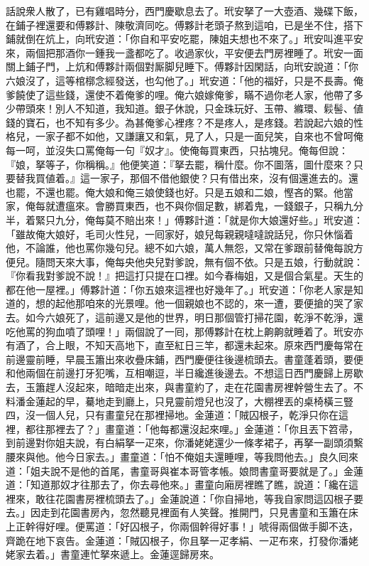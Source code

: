 話說衆人散了，已有雞唱時分，西門慶歇息去了。玳安拏了一大壺酒、幾碟下飯，在鋪子裡還要和傅夥計、陳敬濟同吃。傅夥計老頭子熬到這咱，已是坐不住，搭下鋪就倒在炕上，向玳安道：「你自和平安吃罷，陳姐夫想也不來了。」玳安叫進平安來，兩個把那酒你一鍾我一盞都吃了。收過家伙，平安便去門房裡睡了。玳安一面關上鋪子門，上炕和傅夥計兩個對厮脚兒睡下。傅夥計因閑話，向玳安說道：「你六娘沒了，這等棺槨念經發送，也勾他了。」玳安道：「他的福好，只是不長壽。俺爹饒使了這些錢，還使不着俺爹的哩。俺六娘嫁俺爹，瞞不過你老人家，他帶了多少帶頭來！別人不知道，我知道。銀子休說，只金珠玩好、玉帶、縧環、鬏髻、値錢的寶石，也不知有多少。為甚俺爹心裡疼？不是疼人，是疼錢。{}若說起六娘的性格兒，一家子都不如他，又謙讓又和氣，見了人，只是一面兒笑，自來也不曾呵俺每一呵，並沒失口罵俺每一句『奴才』。使俺每買東西，只拈塊兒。俺每但說：『娘，拏等子，你稱稱。』他便笑道：『拏去罷，稱什麼。你不圖落，圖什麼來？只要替我買値着。』這一家子，那個不借他銀使？只有借出來，沒有個還進去的。還也罷，不還也罷。俺大娘和俺三娘使錢也好。只是五娘和二娘，慳吝的緊。他當家，俺每就遭瘟來。會勝買東西，也不與你個足數，綁着鬼，一錢銀子，只稱九分半，着緊只九分，俺每莫不賠出來！」{}傅夥計道：「就是你大娘還好些。」玳安道：「雖故俺大娘好，毛司火性兒，一囘家好，娘兒每親親噠噠說話兒，你只休惱着他，不論誰，他也罵你幾句兒。{}總不如六娘，萬人無怨，又常在爹跟前替俺每說方便兒。隨問天來大事，俺每央他央兒對爹說，無有個不依。只是五娘，行動就說：『你看我對爹說不說！』把這打只提在口裡。如今春梅姐，又是個合氣星。天生的都在他一屋裡。」{}傅夥計道：「你五娘來這裡也好幾年了。」玳安道：「你老人家是知道的，想的起他那咱來的光景哩。{}他一個親娘也不認的，來一遭，要便搶的哭了家去。{}如今六娘死了，這前邊又是他的世界，明日那個管打掃花園，乾淨不乾淨，還吃他罵的狗血噴了頭哩！」兩個說了一囘，那傅夥計在枕上齁齁就睡着了。{}玳安亦有酒了，合上眼，不知天高地下，直至紅日三竿，都還未起來。原來西門慶每常在前邊靈前睡，早晨玉簫出來收疊床鋪，西門慶便往後邊梳頭去。書童蓬着頭，要便和他兩個在前邊打牙犯嘴，互相嘲逗，半日纔進後邊去。不想這日西門慶歸上房歇去，玉簫趕人沒起來，暗暗走出來，與書童約了，走在花園書房裡幹營生去了。不料潘金蓮起的早，驀地走到廳上，只見靈前燈兒也沒了，大棚裡丟的桌椅橫三豎四，沒一個人兒，{}只有畫童兒在那裡掃地。金蓮道：「賊囚根子，乾淨只你在這裡，都往那裡去了？」畫童道：「他每都還沒起來哩。」金蓮道：「你且丟下笤帚，到前邊對你姐夫說，有白絹拏一疋來，你潘姥姥還少一條孝裙子，再拏一副頭須繫腰來與他。他今日家去。」畫童道：「怕不俺姐夫還睡哩，等我問他去。」良久囘來道：「姐夫說不是他的首尾，書童哥與崔本哥管孝帳。娘問書童哥要就是了。」金蓮道：「知道那奴才往那去了，你去尋他來。」畫童向廂房裡瞧了瞧，{}說道：「纔在這裡來，敢往花園書房裡梳頭去了。」金蓮說道：「你自掃地，等我自家問這囚根子要去。」因走到花園書房內，忽然聽見裡面有人笑聲。推開門，只見書童和玉簫在床上正幹得好哩。便罵道：「好囚根子，你兩個幹得好事！」唬得兩個做手脚不迭，齊跪在地下哀告。金蓮道：「賊囚根子，你且拏一疋孝絹、一疋布來，打發你潘姥姥家去着。」書童連忙拏來遞上。金蓮逕歸房來。

